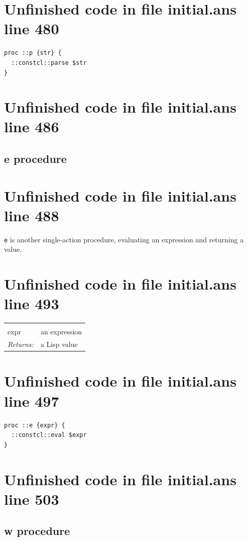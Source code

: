 \documentclass[twoside,9pt]{report}
\begin{document}
\section{Unfinished code in file initial.ans line 480}
\begin{lstlisting}
proc ::p {str} {
  ::constcl::parse $str
}
\end{lstlisting}
\section{Unfinished code in file initial.ans line 486}
\subsection{e procedure}
\label{e-procedure}
\section{Unfinished code in file initial.ans line 488}


\texttt{e} is another single-action procedure, evaluating an expression and returning a value.

\section{Unfinished code in file initial.ans line 493}
\noindent\begin{tabular}{ |p{1.9cm} p{8cm}| }
\hline
\rowcolor[HTML]{CCCCCC} \multicolumn{2}{|l|}{\bf e (internal)} \\
expr & an expression \\
\textit{Returns:} & a Lisp value \\
\hline
\end{tabular}
\section{Unfinished code in file initial.ans line 497}
\begin{lstlisting}
proc ::e {expr} {
  ::constcl::eval $expr
}
\end{lstlisting}
\section{Unfinished code in file initial.ans line 503}
\subsection{w procedure}
\label{w-procedure}
\end{document}
